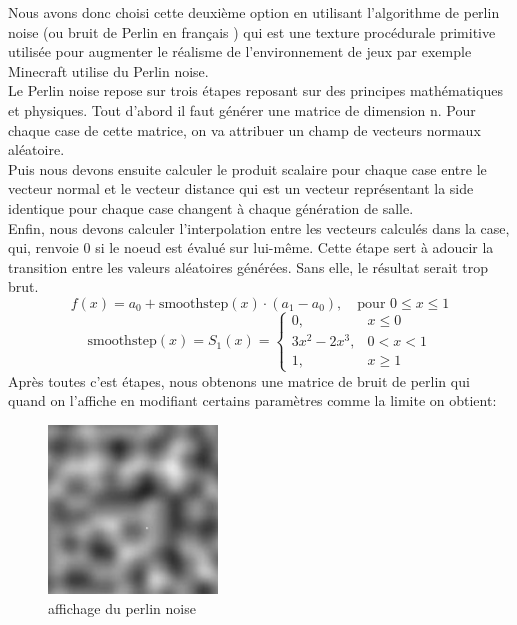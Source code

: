 \documentclass[a4paper,11pt]{article}
\begin{document}
Nous avons donc choisi cette deuxième option en utilisant l'algorithme de perlin noise (ou bruit de Perlin en français ) qui est une texture procédurale primitive utilisée pour augmenter le réalisme de l'environnement de jeux par exemple Minecraft utilise du Perlin noise.\\
Le Perlin noise repose sur trois étapes reposant sur des principes mathématiques et physiques. Tout d'abord il faut générer une matrice de dimension n. Pour chaque case de cette matrice, on va attribuer un champ de vecteurs normaux aléatoire.\\
Puis nous devons ensuite calculer le produit scalaire pour chaque case entre le vecteur normal et le vecteur distance qui est un vecteur représentant la side identique pour chaque case changent à chaque génération de salle.\\
Enfin, nous devons calculer l'interpolation entre les vecteurs calculés dans la case, qui, renvoie 0 si le noeud est évalué sur lui-même. Cette étape sert à adoucir la transition entre les valeurs aléatoires générées. Sans elle, le résultat serait trop brut.\\
\[
f(x) = a_{0} + \text{smoothstep}(x) \cdot (a_{1} - a_{0}), \quad \text{pour } 0 \leq x \leq 1
\]
\begin{equation*}
\text{smoothstep}(x) =
S_1(x) =
\begin{cases} 
0, & x \leq 0 \\ 
3x^2 - 2x^3, & 0 < x < 1 \\ 
1, & x \geq 1
\end{cases}
\end{equation*}
Après toutes c'est étapes, nous obtenons une matrice de bruit de perlin qui quand on l'affiche en modifiant certains paramètres comme la limite on obtient:\
\begin{figure}[ht]
\centering
\includegraphics[width=0.4\textwidth]{./img/perlin.jpg}
\caption{affichage du perlin noise}
\label{fig:affichage perlin}
\end{figure}
\\\\
\end{document}
